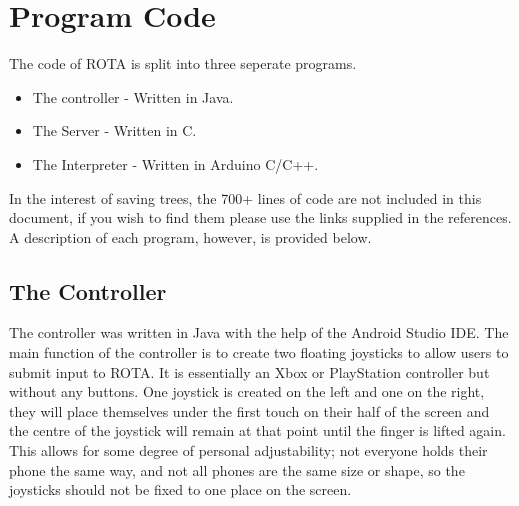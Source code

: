 \section{Program Code}
\par The code of ROTA is split into three seperate programs.
\begin{itemize}
  \item The controller - Written in Java. \cite{Controller}
  \item The Server - Written in C. \cite{Server}
  \item The Interpreter - Written in Arduino C/C++. \cite{Interpreter}
\end{itemize}

\noindent In the interest of saving trees, the 700+ lines of code are not included in this document,
if you wish to find them please use the links supplied in the references. A description of
each program, however, is provided below.

\subsection{The Controller}
\par
The controller was written in Java with the help of the Android Studio IDE.
The main function of the controller is to create two floating joysticks to allow
users to submit input to ROTA. It is essentially an Xbox or PlayStation controller
but without any buttons.
One joystick is created on the left and one on the right, they will place themselves
under the first touch on their half of the screen and the centre of the joystick
will remain at that point until the finger is lifted again. This allows for some degree of personal adjustability; not everyone holds their phone the same way,
and not all phones are the same size or shape, so the joysticks should not be fixed
to one place on the screen.

